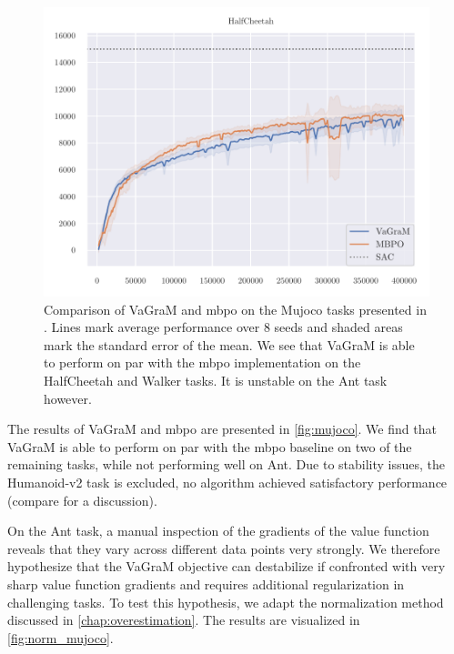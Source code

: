 \begin{figure}[t]
\begin{center}
\begin{minipage}{.49\textwidth}
    \centering
    \includegraphics[width=\textwidth]{figures/vagram/cheetah_nonorm.pdf}
\end{minipage}
\end{center}
    \caption{Comparison of VaGraM and \ac{mbpo} on the Mujoco tasks presented in \textcite{janner2019mbpo}. Lines mark average performance over 8 seeds and shaded areas mark the standard error of the mean. We see that VaGraM is able to perform on par with the \ac{mbpo} implementation on the HalfCheetah and Walker tasks. It is unstable on the Ant task however.}
    \label{fig:mujoco}
\end{figure}


The results of VaGraM and \ac{mbpo} are presented in \autoref{fig:mujoco}.
We find that VaGraM is able to perform on par with the \ac{mbpo} baseline on two of the remaining tasks, while not performing well on Ant.
Due to stability issues, the Humanoid-v2 task is excluded, no algorithm achieved satisfactory performance (compare \textcite{pineda2021mbrl} for a discussion). 

On the Ant task, a manual inspection of the gradients of the value function reveals that they vary across different data points very strongly.
We therefore hypothesize that the VaGraM objective can destabilize if confronted with very sharp value function gradients and requires additional regularization in challenging tasks.
To test this hypothesis, we adapt the normalization method discussed in \autoref{chap:overestimation}.
The results are visualized in \autoref{fig:norm_mujoco}.

